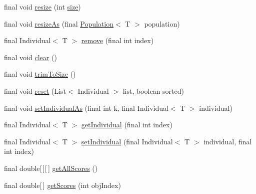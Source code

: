 \begin{DoxyCompactItemize}
\item 
final void \hyperlink{classjenes_1_1population_1_1_population_3_01_t_01extends_01_chromosome_01_4_a57f2be923cd44f27dbb86dca8db817fa}{resize} (int \hyperlink{classjenes_1_1population_1_1_population_3_01_t_01extends_01_chromosome_01_4_adb9f8282e00932d31fddaa4218c5712e}{size})
\item 
final void \hyperlink{classjenes_1_1population_1_1_population_3_01_t_01extends_01_chromosome_01_4_a85700d06c05d04eb82079d853c8c96e7}{resize\-As} (final \hyperlink{classjenes_1_1population_1_1_population_3_01_t_01extends_01_chromosome_01_4_a0f7b4a9eda8a4dadbc70f8585def56bd}{Population}$<$ T $>$ population)
\item 
final Individual$<$ T $>$ \hyperlink{classjenes_1_1population_1_1_population_3_01_t_01extends_01_chromosome_01_4_a5774fef1bf045d8adc89d6f345d88f17}{remove} (final int index)
\item 
final void \hyperlink{classjenes_1_1population_1_1_population_3_01_t_01extends_01_chromosome_01_4_a6fcd1cc255202adfdff8de7a48fe58ea}{clear} ()
\item 
final void \hyperlink{classjenes_1_1population_1_1_population_3_01_t_01extends_01_chromosome_01_4_a6a1028fae27d78e7d239b6cfcc2e028d}{trim\-To\-Size} ()
\item 
final void \hyperlink{classjenes_1_1population_1_1_population_3_01_t_01extends_01_chromosome_01_4_a7dbaea1fd974af42875f636e7215f8b6}{reset} (List$<$ Individual $>$ list, boolean sorted)
\item 
final void \hyperlink{classjenes_1_1population_1_1_population_3_01_t_01extends_01_chromosome_01_4_aff83144d4b558dcb517ccdcc9ff38918}{set\-Individual\-As} (final int k, final Individual$<$ T $>$ individual)
\item 
final Individual$<$ T $>$ \hyperlink{classjenes_1_1population_1_1_population_3_01_t_01extends_01_chromosome_01_4_a5d2f001f4231421e7f6e496d64624bc5}{get\-Individual} (final int index)
\item 
final Individual$<$ T $>$ \hyperlink{classjenes_1_1population_1_1_population_3_01_t_01extends_01_chromosome_01_4_a5bbd5716ed2a0cac05652795d4bcc84a}{set\-Individual} (final Individual$<$ T $>$ individual, final int index)
\item 
final double\mbox{[}$\,$\mbox{]}\mbox{[}$\,$\mbox{]} \hyperlink{classjenes_1_1population_1_1_population_3_01_t_01extends_01_chromosome_01_4_a248c61464f3f188466989292f4f25811}{get\-All\-Scores} ()
\item 
final double\mbox{[}$\,$\mbox{]} \hyperlink{classjenes_1_1population_1_1_population_3_01_t_01extends_01_chromosome_01_4_a2322c578af3781d89781617203465c2f}{get\-Scores} (int obj\-Index)

\end{DoxyCompactItemize}
